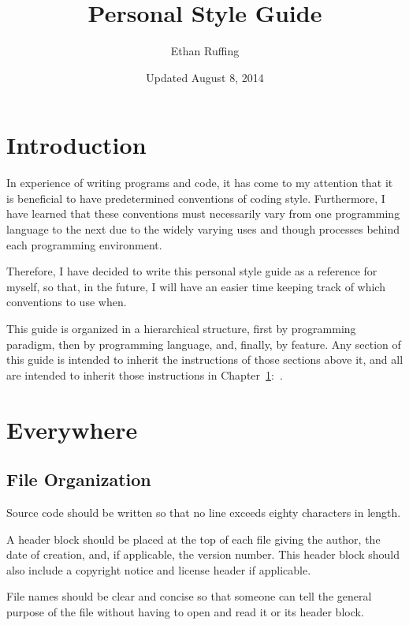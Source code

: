 \documentclass[12pt,letter]{memoir} %
\title{Personal Style Guide}
\author{Ethan Ruffing}
\date{Updated August 8, 2014} %
\begin{document}
\maketitle
\thispagestyle{plainnotice}


\clearpage\mbox{}\thispagestyle{empty}\clearpage

\tableofcontents*

\newpage
\thispagestyle{empty}
\mbox{}

\chapter*{Introduction}
In experience of writing programs and code, it has come to my attention that it
is beneficial to have predetermined conventions of coding style. Furthermore, I
have learned that these conventions must necessarily vary from one programming
language to the next due to the widely varying uses and though processes behind
each programming environment.

Therefore, I have decided to write this personal style guide as a reference for
myself, so that, in the future, I will have an easier time keeping track of
which conventions to use when.

This guide is organized in a hierarchical structure, first by programming
paradigm, then by programming language, and, finally, by feature. Any section of
this guide is intended to inherit the instructions of those sections above it,
and all are intended to inherit those instructions in
Chapter~\ref{chap:everywhere}:~.

\chapter{Everywhere}\label{chap:everywhere}
	\section{File Organization}
		Source code should be written so that no line exceeds eighty characters
		in length.

		A header block should be placed at the top of each file giving the
		author, the date of creation, and, if applicable, the version number.
		This header block should also include a copyright notice and license
		header if applicable.

		File names should be clear and concise so that someone can tell the
		general purpose of the file without having to open and read it or its
		header block.
\end{document}
